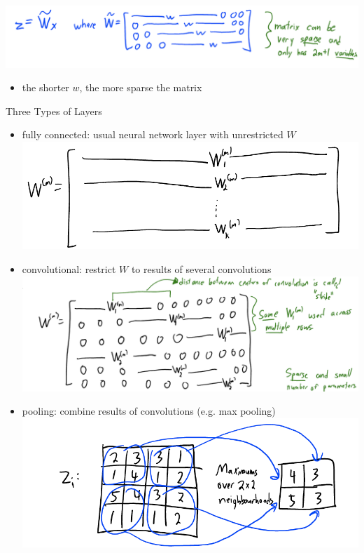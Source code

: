 \documentclass[10pt,landscape,a4paper]{article}
\begin{document}
\begin{multicols*}{5}
\includegraphics[scale=0.12]{convolution_as_matrix_multiplication}
\begin{itemize}
    \item the shorter \(w\), the more sparse the matrix
\end{itemize}
Three Types of Layers
\begin{itemize}
    \item fully connected: usual neural network layer with unrestricted \(W\) \\
    \includegraphics[scale=0.1]{fully_connected}
    \item convolutional: restrict \(W\) to results of several convolutions \\
    \includegraphics[scale=0.1]{convolutional}
    \item pooling: combine results of convolutions (e.g. max pooling) \\
    \includegraphics[scale=0.1]{max_pooling}
\end{itemize}


\end{multicols*}
\end{document}

